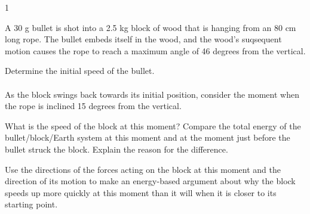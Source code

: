 
\AddToShipoutPicture*{\BackgroundPic}

\addtocounter {ProbNum} {1}

 
{\bf \Large{}} A 30 g bullet is shot into a 2.5 kg block of wood that is hanging from an 80 cm long rope. The bullet embeds itself in the wood, and the wood's suqsequent motion causes the rope to reach a maximum angle of 46 degrees from the vertical.\bigskip

Determine the initial speed of the bullet. \paragraph{}
\noindent
\vfill

As the block swings back towards its initial position, consider the moment when the rope is inclined 15 degrees from the vertical.  

\bigskip
What is the speed of the block at this moment? Compare the total energy of the bullet/block/Earth system at this moment and at the moment just before the bullet struck the block.  Explain the reason for the difference.
\vfill

Use the directions of the forces acting on the block at this moment and the direction of its motion to make an energy-based argument about why the block speeds up more quickly at this moment than it will when it is closer to its starting point.
\vfill
\newpage